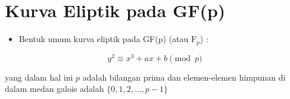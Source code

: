 \documentclass{article}
\begin{document}

\section*{Kurva Eliptik pada GF(p)}

\begin{itemize}
    \item Bentuk umum kurva eliptik pada GF(p) (atau $\text{F}_p$) :
\end{itemize}

\[ y^2 \equiv x^3 + ax + b \pmod{p} \]

\vspace{10mm}

yang dalam hal ini $p$ adalah bilangan prima dan elemen-elemen himpunan di dalam medan galois adalah $\{0, 1, 2, \dots, p-1\}$
\end{document}
